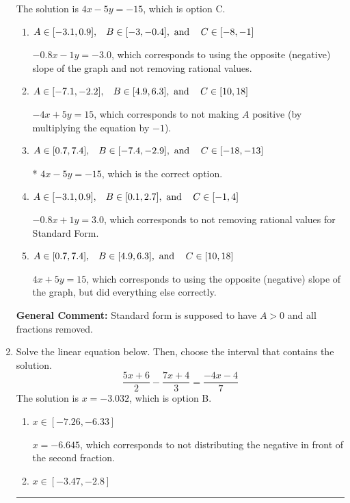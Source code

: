 \documentclass{extbook}[14pt]
\newcommand{\litem}[1]{\item #1

\rule{\textwidth}{0.4pt}}
\begin{document}
\begin{enumerate}
{The solution is \( 4x - 5y = -15 \), which is option C.\begin{enumerate}[label=\Alph*.]
\item \( A \in [-3.1, 0.9], \hspace{3mm} B \in [-3, -0.4], \text{ and } \hspace{3mm} C \in [-8, -1] \)

 $-0.8x - 1y = -3.0$, which corresponds to using the opposite (negative) slope of the graph and not removing rational values.
\item \( A \in [-7.1, -2.2], \hspace{3mm} B \in [4.9, 6.3], \text{ and } \hspace{3mm} C \in [10, 18] \)

 $-4x + 5y = 15$, which corresponds to not making $A$ positive (by multiplying the equation by $-1$).
\item \( A \in [0.7, 7.4], \hspace{3mm} B \in [-7.4, -2.9], \text{ and } \hspace{3mm} C \in [-18, -13] \)

* $4x - 5y = -15$, which is the correct option.
\item \( A \in [-3.1, 0.9], \hspace{3mm} B \in [0.1, 2.7], \text{ and } \hspace{3mm} C \in [-1, 4] \)

 $-0.8x + 1y = 3.0$, which corresponds to not removing rational values for Standard Form.
\item \( A \in [0.7, 7.4], \hspace{3mm} B \in [4.9, 6.3], \text{ and } \hspace{3mm} C \in [10, 18] \)

 $4x + 5y = 15$, which corresponds to using the opposite (negative) slope of the graph, but did everything else correctly.
\end{enumerate}

\textbf{General Comment:} Standard form is supposed to have $A > 0$ and all fractions removed.
}
\litem{
Solve the linear equation below. Then, choose the interval that contains the solution.
\[ \frac{5x + 6}{2} - \frac{7x + 4}{3} = \frac{-4x -4}{7} \]The solution is \( x = -3.032 \), which is option B.\begin{enumerate}[label=\Alph*.]
\item \( x \in [-7.26, -6.33] \)

 $x = -6.645$, which corresponds to not distributing the negative in front of the second fraction.
\item \( x \in [-3.47, -2.8] \)


\end{enumerate}}
\end{enumerate}
\end{document}
